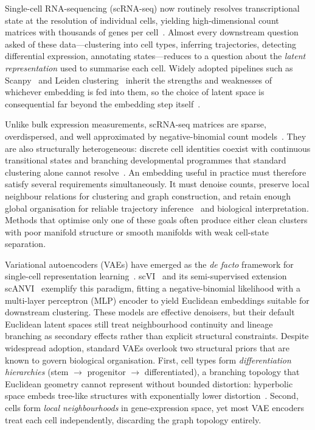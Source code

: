 \documentclass[preprint,12pt]{elsarticle}
\begin{document}
Single-cell RNA-sequencing (scRNA-seq) now routinely resolves
transcriptional state at the resolution of individual cells, yielding
high-dimensional count matrices with thousands of genes per
cell~\cite{zheng2017massively}. Almost every downstream question asked
of these data---clustering into cell types, inferring trajectories,
detecting differential expression, annotating states---reduces to a
question about the \emph{latent representation} used to summarise
each cell. Widely adopted pipelines such as
Scanpy~\cite{wolf2018scanpy} and Leiden
clustering~\cite{traag2019leiden} inherit the strengths and weaknesses
of whichever embedding is fed into them, so the choice of latent
space is consequential far beyond the embedding step
itself~\cite{luecken2019bestpractices,lahnemann2020grandchallenges}.

Unlike bulk expression measurements, scRNA-seq matrices are sparse,
overdispersed, and well approximated by negative-binomial count
models~\cite{hafemeister2019sctransform,svensson2020droplet}.
They are also structurally heterogeneous: discrete cell identities
coexist with continuous transitional states and branching developmental
programmes that standard clustering
alone cannot resolve~\cite{trapnell2014monocle,haghverdi2016dpt}.
An embedding useful in practice must therefore satisfy several
requirements simultaneously.
It must denoise counts, preserve local neighbour relations for
clustering and graph construction, and retain enough global
organisation for reliable trajectory
inference~\cite{saelens2019trajectory} and biological interpretation.
Methods that optimise only one of these goals often produce either clean
clusters with poor manifold structure or smooth manifolds with weak
cell-state separation.

Variational autoencoders (VAEs) have emerged as the \emph{de facto}
framework for single-cell representation
learning~\cite{lopez2018deep,gronbech2020scvae}.
scVI~\cite{lopez2018deep} and its semi-supervised extension
scANVI~\cite{xu2021scanvi} exemplify this paradigm, fitting a
negative-binomial likelihood with a multi-layer perceptron (MLP) encoder to
yield Euclidean embeddings suitable for downstream clustering.
These models are effective denoisers, but their default Euclidean latent
spaces still treat neighbourhood continuity and lineage branching as
secondary effects rather than explicit structural constraints.
Despite widespread adoption, standard VAEs overlook two structural priors
that are known to govern biological organisation.
First, cell types form \emph{differentiation hierarchies}
(stem $\to$ progenitor $\to$ differentiated), a branching topology that
Euclidean geometry cannot represent without bounded distortion:
hyperbolic space embeds tree-like structures with exponentially lower
distortion~\cite{nickel2017poincare,ganea2018hyperbolic}.
Second, cells form \emph{local neighbourhoods} in gene-expression space,
yet most VAE encoders treat each cell independently, discarding the graph
topology entirely.
\end{document}
